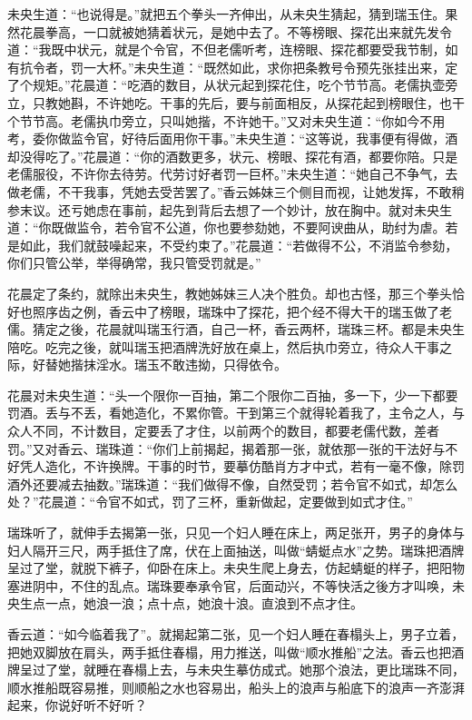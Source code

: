 \documentclass[a4paper,12pt,UTF8,twoside]{ctexbook}
\begin{document}
未央生道：“也说得是。”就把五个拳头一齐伸出，从未央生猜起，猜到瑞玉住。果然花晨拳高，一口就被她猜着状元，是她中去了。不等榜眼、探花出来就先发令道：“我既中状元，就是个令官，不但老儒听考，连榜眼、探花都要受我节制，如有抗令者，罚一大杯。”未央生道：“既然如此，求你把条教号令预先张挂出来，定了个规矩。”花晨道：“吃酒的数目，从状元起到探花住，吃个节节高。老儒执壶旁立，只教她斟，不许她吃。干事的先后，要与前面相反，从探花起到榜眼住，也干个节节高。老儒执巾旁立，只叫她揩，不许她干。”又对未央生道：“你如今不用考，委你做监令官，好待后面用你干事。”未央生道：“这等说，我事便有得做，酒却没得吃了。”花晨道：“你的酒数更多，状元、榜眼、探花有酒，都要你陪。只是老儒服役，不许你去待劳。代劳讨好者罚一巨杯。”未央生道：“她自己不争气，去做老儒，不干我事，凭她去受苦罢了。”香云姊妹三个侧目而视，让她发挥，不敢稍参末议。还亏她虑在事前，起先到背后去想了一个妙计，放在胸中。就对未央生道：“你既做监令，若令官不公道，你也要参劾她，不要阿谀曲从，助纣为虐。若是如此，我们就鼓噪起来，不受约束了。”花晨道：“若做得不公，不消监令参劾，你们只管公举，举得确常，我只管受罚就是。”

花晨定了条约，就除出未央生，教她姊妹三人决个胜负。却也古怪，那三个拳头恰好也照序齿之例，香云中了榜眼，瑞珠中了探花，把个经不得大干的瑞玉做了老儒。猜定之後，花晨就叫瑞玉行酒，自己一杯，香云两杯，瑞珠三杯。都是未央生陪吃。吃完之後，就叫瑞玉把酒牌洗好放在桌上，然后执巾旁立，待众人干事之际，好替她揩抹淫水。瑞玉不敢违拗，只得依令。

花晨对未央生道：“头一个限你一百抽，第二个限你二百抽，多一下，少一下都要罚酒。丢与不丢，看她造化，不累你管。干到第三个就得轮着我了，主令之人，与众人不同，不计数目，定要丢了才住，以前两个的数目，都要老儒代数，差者罚。”又对香云、瑞珠道：“你们上前揭起，揭着那一张，就依那一张的干法好与不好凭人造化，不许换牌。干事的时节，要摹仿酷肖方才中式，若有一毫不像，除罚酒外还要减去抽数。”瑞珠道：“我们做得不像，自然受罚；若令官不如式，却怎么处？”花晨道：“令官不如式，罚了三杯，重新做起，定要做到如式才住。”

瑞珠听了，就伸手去揭第一张，只见一个妇人睡在床上，两足张开，男子的身体与妇人隔开三尺，两手抵住了席，伏在上面抽送，叫做“蜻蜓点水”之势。瑞珠把酒牌呈过了堂，就脱下裤子，仰卧在床上。未央生爬上身去，仿起蜻蜓的样子，把阳物塞进阴中，不住的乱点。瑞珠要奉承令官，后面动兴，不等快活之後方才叫唤，未央生点一点，她浪一浪；点十点，她浪十浪。直浪到不点才住。

香云道：“如今临着我了”。就揭起第二张，见一个妇人睡在春榻头上，男子立着，把她双脚放在肩头，两手抵住春榻，用力推送，叫做“顺水推船”之法。香云也把酒牌呈过了堂，就睡在春榻上去，与未央生摹仿成式。她那个浪法，更比瑞珠不同，顺水推船既容易推，则顺船之水也容易出，船头上的浪声与船底下的浪声一齐澎湃起来，你说好听不好听？
\end{document}
